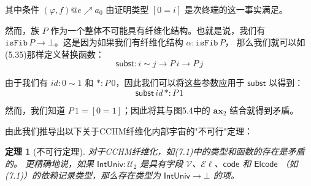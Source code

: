 \documentclass{ctexrep}
\theoremstyle{plain}
\newtheorem{theorem}{定理}[section]
\theoremstyle{definition}
\theoremstyle{remark}
\begin{document}
其中条件 $(\varphi,f)@e \nearrow a_0$ 由证明类型 $[0=i]$ 是次终端的这一事实满足。

然而，族 $P$ 作为一个整体不可能具有纤维化结构。也就是说，我们有
$\mathtt{isFib}\,P \to \bot$。这是因为如果我们有纤维化结构 $\alpha : \mathtt{isFib}\,P$，
那么我们就可以如(5.35)那样定义替换函数：
\[
\mathsf{subst} : i \sim j \to P\,i \to P\,j
\]

由于我们有 $ id  : 0 \sim 1$ 和 $* : P\,0$，因此我们可以将这些参数应用于 
$\mathsf{subst}$ 以得到：
\[
\mathsf{subst}\, id \,* : P\,1
\]

然而，我们知道 $P\,1 = [0=1]$；因此将其与图5.4中的 $\mathbf{ax}_2$ 结合就得到矛盾。

由此我们推导出以下关于CCHM纤维化内部宇宙的"不可行"定理：

\begin{theorem}[不可行定理]
对于CCHM纤维化，如(7.1)中的类型和函数的存在是矛盾的。
更精确地说，如果 $\mathsf{IntUniv} : \mathcal{U}_2$ 是具有字段 $\mathcal{V}$、$\mathcal{E}\!\ell$、$\mathsf{code}$ 和 $\mathsf{Elcode}$ 
（如(7.1)）的依赖记录类型，那么存在类型为 $\mathsf{IntUniv} \to \bot$ 的项。
\end{theorem}
\end{document}
